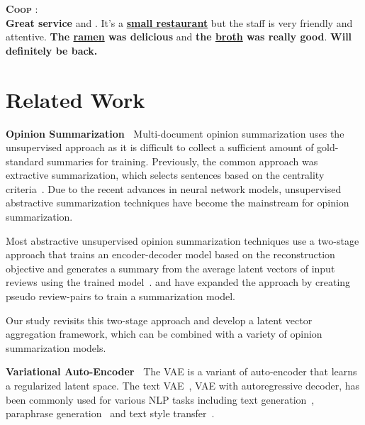 \documentclass[11pt]{article}
\newcommand{\aggname}{\textsc{Coop}}
\newcommand{\name}{\mbox{\sc BiMeanVAE}}
\newcommand{\simpleavg}{\mbox{SimpleAvg}}
\newcommand{\yelp}{\mbox{\bf Yelp}}
\newcommand{\hl}[1]{#1}
\newcommand\two[1]{\textcolor{c2}{\textbf{#1}}}
\newcommand\three[1]{\textcolor{c3}{\textbf{#1}}}
\newcommand\four[1]{\textcolor{c4}{\textbf{#1}}}
\newcommand\five[1]{\textcolor{c5}{\textbf{#1}}}
\newcommand\six[1]{\textcolor{c6}{\textbf{#1}}}
\begin{document}
\begin{figure*}[th]
\begin{mdframed}
        \textbf{\aggname{}} :\\
        \two{Great service} and . It's a \three{\underline{small restaurant}} but the staff is very friendly and attentive. \four{The \underline{ramen} was delicious} and \five{the \underline{broth} was really good}. \six{Will definitely be back.}\\
        \end{mdframed}
    \vspace{-0.5em}
    \caption{Example of summaries generated by \name{} with \simpleavg{} and \aggname{} for reviews about a product on the \yelp{} dataset.
    The colors denote the corresponding opinions, and struck-through reviews in gray were not selected by \aggname{} for summary generation (Note that \simpleavg{} uses all the input reviews.) Terms that are more specific to the entity are underlined. }
    \label{fig:example-yelp}
\end{figure*}

\section{Related Work}
\noindent
{\bf Opinion Summarization~} Multi-document opinion summarization uses the unsupervised approach as it is difficult to collect a sufficient amount of gold-standard summaries for training.
Previously, the common approach was extractive summarization, which selects sentences based on the centrality criteria~\cite{erkan2004lexrank}.
Due to the recent advances in neural network models, unsupervised abstractive summarization techniques have become the mainstream for opinion summarization.

Most abstractive unsupervised opinion summarization techniques use a two-stage approach that trains an encoder-decoder model based on the reconstruction objective and generates a summary from the average latent \hl{vectors} of input reviews using the trained model~\cite{Chu:2019:MeanSum}. \citet{amplayo-lapata-2020-unsupervised} and \citet{amplayo2021unsupervised} \hl{have} expanded the approach by creating pseudo review-pairs to train a summarization model.

Our study revisits this two-stage approach and develop a latent \hl{vector} aggregation framework, which can be combined with \hl{a variety of} opinion summarization models.

\noindent
{\bf Variational Auto-Encoder~}
The VAE is a variant of auto-encoder that learns a regularized latent space. The text VAE~\cite{bowman-etal-2016-generating}, VAE with autoregressive decoder, has been commonly used for various NLP tasks including text generation~\cite{ye2020variational}, paraphrase generation~\cite{bao-etal-2019-generating} and text style transfer~\cite{hu2017toward,john-etal-2019-disentangled}.
\end{document}

